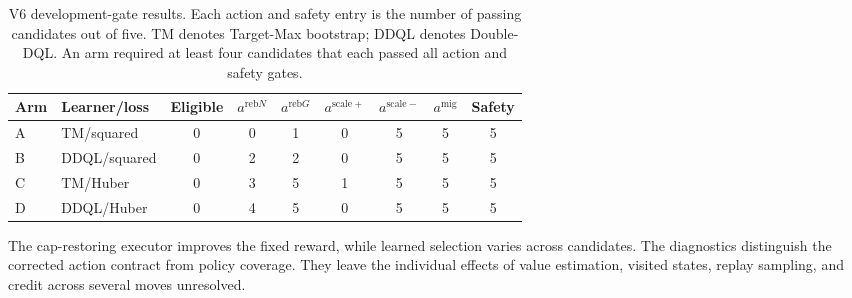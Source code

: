 \begin{table}[t]
  \caption{V6 development-gate results. Each action and safety entry is the
  number of passing candidates out of five. TM denotes Target-Max bootstrap;
  DDQL denotes Double-DQL. An arm required at least four candidates that each
  passed all action and safety gates.}
  \label{tab:v6-factorial-coverage}
  \centering
  \small
  \setlength{\tabcolsep}{3pt}
  \begin{tabular}{llccccccc}
    \toprule
    Arm & Learner/loss & Eligible & $a^{\mathrm{reb}N}$ & $a^{\mathrm{reb}G}$ & $a^{\mathrm{scale}+}$ & $a^{\mathrm{scale}-}$ & $a^{\mathrm{mig}}$ & Safety \\
    \midrule
    A & TM/squared & 0 & 0 & 1 & 0 & 5 & 5 & 5 \\
    B & DDQL/squared & 0 & 2 & 2 & 0 & 5 & 5 & 5 \\
    C & TM/Huber & 0 & 3 & 5 & 1 & 5 & 5 & 5 \\
    D & DDQL/Huber & 0 & 4 & 5 & 0 & 5 & 5 & 5 \\
    \bottomrule
  \end{tabular}
\end{table}


The cap-restoring executor improves the fixed reward, while learned selection
varies across candidates. The diagnostics distinguish the corrected action
contract from policy coverage. They leave the individual effects of value
estimation, visited states, replay sampling, and credit across several moves
unresolved.

